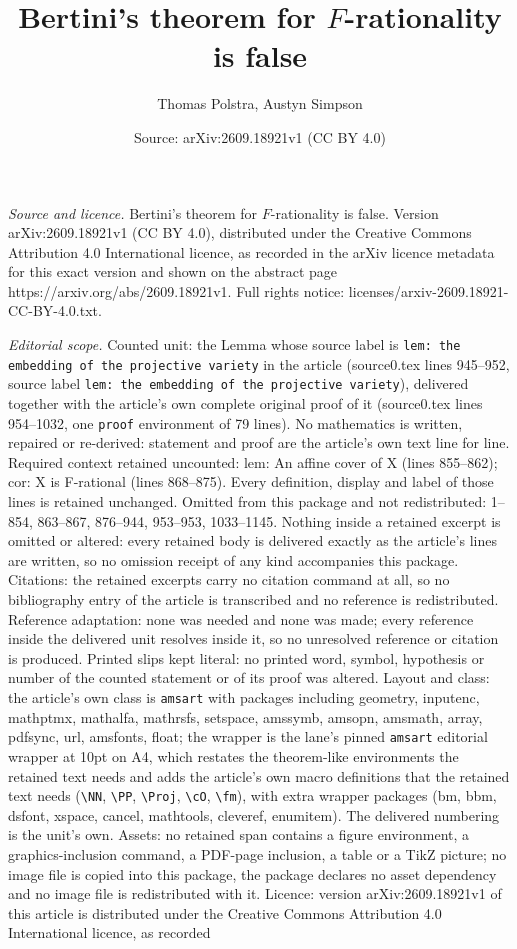 \documentclass[10pt,a4paper]{amsart}
\title[Bertini's theorem for $F$-rationality is false]{Bertini's theorem for $F$-rationality is false}
\author{Thomas Polstra, Austyn Simpson}
\date{Source: arXiv:2609.18921v1 (CC BY 4.0)}
\begin{document}
\maketitle

\noindent\emph{Source and licence.} Bertini's theorem for $F$-rationality is false. Version arXiv:2609.18921v1 (CC BY 4.0), distributed under the Creative Commons Attribution 4.0 International licence, as recorded in the arXiv licence metadata for this exact version and shown on the abstract page https://arxiv.org/abs/2609.18921v1. Full rights notice: licenses/arxiv-2609.18921-CC-BY-4.0.txt.\par\smallskip

\noindent\textit{Editorial scope.} Counted unit: the Lemma whose source label is \texttt{lem: the embedding of the projective variety} in the article (source0.tex lines 945--952, source label \texttt{lem: the embedding of the projective variety}), delivered together with the article's own complete original proof of it (source0.tex lines 954--1032, one \texttt{proof} environment of 79 lines). No mathematics is written, repaired or re-derived: statement and proof are the article's own text line for line. Required context retained uncounted: lem: An affine cover of X (lines 855--862); cor: X is F-rational (lines 868--875). Every definition, display and label of those lines is retained unchanged. Omitted from this package and not redistributed: 1--854, 863--867, 876--944, 953--953, 1033--1145. Nothing inside a retained excerpt is omitted or altered: every retained body is delivered exactly as the article's lines are written, so no omission receipt of any kind accompanies this package. Citations: the retained excerpts carry no citation command at all, so no bibliography entry of the article is transcribed and no reference is redistributed. Reference adaptation: none was needed and none was made; every reference inside the delivered unit resolves inside it, so no unresolved reference or citation is produced. Printed slips kept literal: no printed word, symbol, hypothesis or number of the counted statement or of its proof was altered. Layout and class: the article's own class is \texttt{amsart} with packages including geometry, inputenc, mathptmx, mathalfa, mathrsfs, setspace, amssymb, amsopn, amsmath, array, pdfsync, url, amsfonts, float; the wrapper is the lane's pinned \texttt{amsart} editorial wrapper at 10pt on A4, which restates the theorem-like environments the retained text needs and adds the article's own macro definitions that the retained text needs (\texttt{\textbackslash NN}, \texttt{\textbackslash PP}, \texttt{\textbackslash Proj}, \texttt{\textbackslash cO}, \texttt{\textbackslash fm}), with extra wrapper packages (bm, bbm, dsfont, xspace, cancel, mathtools, cleveref, enumitem). The delivered numbering is the unit's own. Assets: no retained span contains a figure environment, a graphics-inclusion command, a PDF-page inclusion, a table or a TikZ picture; no image file is copied into this package, the package declares no asset dependency and no image file is redistributed with it. Licence: version arXiv:2609.18921v1 of this article is distributed under the Creative Commons Attribution 4.0 International licence, as recorded 
\end{document}
